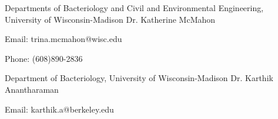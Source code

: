 
\begin{cventries}
  \cventry
    {Departments of Bacteriology and Civil and Environmental Engineering, University of Wisconsin-Madison} %
    {Dr. Katherine McMahon} %
    {} %
    {} %
    {
      \begin{cvitems} %
        \item {Email: trina.mcmahon@wisc.edu}
        \item {Phone: (608)890-2836}
      \end{cvitems}
    }
\cventry
    {Department of Bacteriology, University of Wisconsin-Madison} %
    {Dr. Karthik Anantharaman} %
    {} %
    {} %
    {
     \begin{cvitems} %
        \item{Email: karthik.a@berkeley.edu}
      \end{cvitems}
    }
\end{cventries}